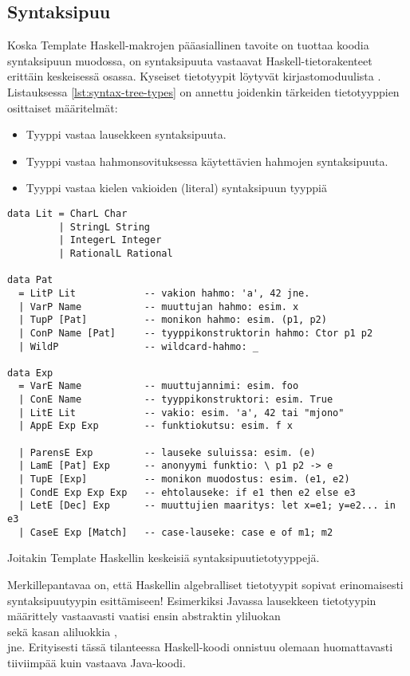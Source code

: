 \subsection{Syntaksipuu}
Koska Template Haskell-makrojen pääasiallinen tavoite on tuottaa koodia syntaksipuun muodossa,
on syntaksipuuta vastaavat Haskell-tietorakenteet erittäin keskeisessä osassa.
Kyseiset tietotyypit löytyvät kirjastomoduulista .
Listauksessa \ref{lst:syntax-tree-types} on annettu joidenkin tärkeiden tietotyyppien
osittaiset määritelmät:
\begin{itemize}
    \item Tyyppi  vastaa lausekkeen syntaksipuuta.
    \item Tyyppi  vastaa hahmonsovituksessa käytettävien hahmojen syntaksipuuta.
    \item Tyyppi  vastaa kielen vakioiden (literal) syntaksipuun tyyppiä
\end{itemize}

\begin{listing}[H]
\begin{verbatim}
data Lit = CharL Char
         | StringL String
         | IntegerL Integer
         | RationalL Rational

data Pat
  = LitP Lit            -- vakion hahmo: 'a', 42 jne.
  | VarP Name           -- muuttujan hahmo: esim. x
  | TupP [Pat]          -- monikon hahmo: esim. (p1, p2)
  | ConP Name [Pat]     -- tyyppikonstruktorin hahmo: Ctor p1 p2
  | WildP               -- wildcard-hahmo: _

data Exp
  = VarE Name           -- muuttujannimi: esim. foo
  | ConE Name           -- tyyppikonstruktori: esim. True
  | LitE Lit            -- vakio: esim. 'a', 42 tai "mjono"
  | AppE Exp Exp        -- funktiokutsu: esim. f x

  | ParensE Exp         -- lauseke suluissa: esim. (e)
  | LamE [Pat] Exp      -- anonyymi funktio: \ p1 p2 -> e
  | TupE [Exp]          -- monikon muodostus: esim. (e1, e2)
  | CondE Exp Exp Exp   -- ehtolauseke: if e1 then e2 else e3
  | LetE [Dec] Exp      -- muuttujien maaritys: let x=e1; y=e2... in e3
  | CaseE Exp [Match]   -- case-lauseke: case e of m1; m2
\end{verbatim}
\label{lst:syntax-tree-types}
\caption{Joitakin Template Haskellin keskeisiä syntaksipuutietotyyppejä.}
\end{listing}

Merkillepantavaa on,
että Haskellin algebralliset tietotyypit sopivat erinomaisesti syntaksipuutyypin esittämiseen!
Esimerkiksi Javassa lausekkeen tietotyypin määrittely vastaavasti vaatisi ensin abstraktin yliluokan \\
 sekä kasan aliluokkia ,\\
 jne.
Erityisesti tässä tilanteessa Haskell-koodi onnistuu olemaan huomattavasti tiiviimpää kuin vastaava Java-koodi.

